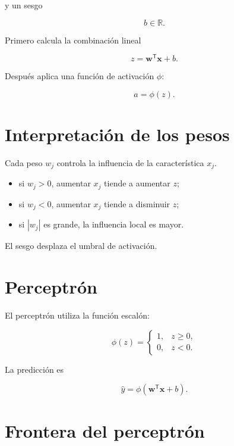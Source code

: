 \documentclass[
  spanish,
  10.5pt,
  letterpaper,
  DIV=11,
  numbers=noendperiod,
  oneside,
  open=any]{scrreprt}
\providecommand{\tightlist}{%
  \setlength{\itemsep}{0pt}\setlength{\parskip}{0pt}}
\theoremstyle{definition}
\theoremstyle{definition}
\theoremstyle{plain}
\theoremstyle{remark}
\begin{document}
y un sesgo

\[
b\in\mathbb{R}.
\]

Primero calcula la combinación lineal

\[
z
=
\mathbf{w}^{\mathsf T}\mathbf{x}+b.
\]

Después aplica una función de activación \(\phi\):

\[
a
=
\phi(z).
\]

\section*{Interpretación de los
pesos}\label{interpretaciuxf3n-de-los-pesos}


Cada peso \(w_j\) controla la influencia de la característica \(x_j\).

\begin{itemize}
\tightlist
\item
  si \(w_j>0\), aumentar \(x_j\) tiende a aumentar \(z\);
\item
  si \(w_j<0\), aumentar \(x_j\) tiende a disminuir \(z\);
\item
  si \(|w_j|\) es grande, la influencia local es mayor.
\end{itemize}

El sesgo desplaza el umbral de activación.

\section*{Perceptrón}\label{perceptruxf3n}


El perceptrón utiliza la función escalón:

\[
\phi(z)
=
\begin{cases}
1, & z\geq 0,\\
0, & z<0.
\end{cases}
\]

La predicción es

\[
\widehat{y}
=
\phi
\left(
\mathbf{w}^{\mathsf T}\mathbf{x}+b
\right).
\]

\section*{Frontera del perceptrón}\label{frontera-del-perceptruxf3n}
\end{document}
